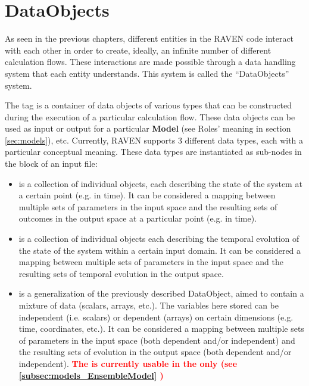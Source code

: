 \section{DataObjects}
\label{sec:DataObjects}

As seen in the previous chapters, different entities in the RAVEN
code interact with each other in order to create, ideally, an infinite number of
different calculation flows.
%
These interactions are made possible through a data handling system that each
entity understands.
%
This system is called the ``DataObjects'' system.

The  tag is a container of data objects of various types that can
be constructed during the execution of a particular calculation flow.
%
These data objects can be used as input or output for a particular
\textbf{Model} (see Roles' meaning in section \ref{sec:models}), etc.
%
Currently, RAVEN supports 3 different data types, each with a particular
conceptual meaning.
%
These data types are instantiated as sub-nodes in the  block of
an input file:
\begin{itemize}
  \item {} is a collection of individual objects, each
  describing the state of the system at a certain point (e.g. in time).
  It can be considered a mapping between multiple sets of parameters in the
  input space and the resulting sets of outcomes in the output space at a
  particular point (e.g. in time).
  \item {} is a collection of individual objects each
  describing the temporal evolution of the state of the system within a certain
  input domain.
  It can be considered a mapping between multiple sets of parameters in the
  input space and the resulting sets of temporal evolution in the output
  space.
   \item {} is a generalization of the previously described DataObject, 
   aimed to contain a mixture of data (scalars, arrays, etc.). The variables here stored
   can be independent (i.e. scalars) or dependent (arrays) on certain dimensions (e.g. time, coordinates, etc.).
  It can be considered a mapping between multiple sets of parameters in the
  input space (both dependent and/or independent) and the resulting sets of evolution in the output
  space (both dependent and/or independent).
  \nb \textcolor{red} {\textbf{The   is currently usable in the   only (see \ref{subsec:models_EnsembleModel} )}}
\end{itemize}

